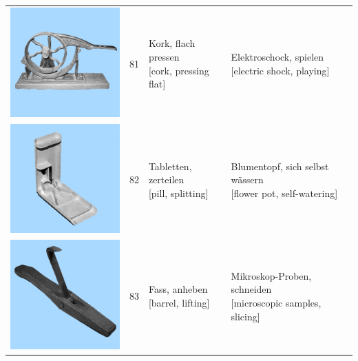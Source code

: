 \documentclass[
  english,
  man,floatsintext]{apa7}
\begin{document}
\begin{center}
\begin{ThreePartTable}
{\begin{longtable}{llll}
\includegraphics[valign=c, scale=0.23]{../materials/unfamiliar/81.png} & 81 & \makecell[l]{Kork, flach pressen\\{[cork, pressing flat]}} & \makecell[l]{Elektroschock, spielen\\{[electric shock, playing]}}\\
\includegraphics[valign=c, scale=0.23]{../materials/unfamiliar/82.png} & 82 & \makecell[l]{Tabletten, zerteilen\\{[pill, splitting]}} & \makecell[l]{Blumentopf, sich selbst wässern\\{[flower pot, self-watering]}}\\
\includegraphics[valign=c, scale=0.23]{../materials/unfamiliar/83.png} & 83 & \makecell[l]{Fass, anheben\\{[barrel, lifting]}} & \makecell[l]{Mikroskop-Proben, schneiden\\{[microscopic samples, slicing]}}\\

\end{longtable}}
\end{ThreePartTable}
\end{center}
\end{document}
